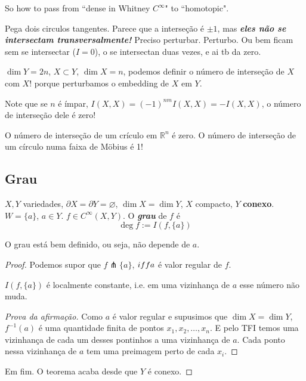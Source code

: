 \begin{remark}[dani]\leavevmode
So how to pass from ``dense in Whitney \(C^\infty\)" to ``homotopic".
\end{remark}

\begin{example}\leavevmode
	Pega dois circulos tangentes. Parece que a interseção é \(\pm  1\), mas \textit{\textbf{eles não se intersectam transversalmente!}} Preciso perturbar. Perturbo. Ou bem ficam sem se intersectar (\(I=0\)), o se intersectan duas vezes, e ai tb da zero.
\end{example}

\begin{remark}\leavevmode
\(\dim Y=2n\), \(X \subset Y\), \(\dim X= n\), podemos definir o número de interseção de \(X\) com \(X\)! porque perturbamos o embedding de \(X\) em \(Y\).

Note que se  \(n\) é ímpar, \(I(X,X)=(-1)^{nm}I(X,X)=-I(X,X)\), o número de interseção dele é zero!
\end{remark}

\begin{example}\leavevmode
	O número de interseção de um crículo em \(\mathbb{R}^n\) é zero. O número de interseção de um círculo numa faixa de Möbius é 1!
\end{example}

\subsection{Grau}

\begin{defn}\leavevmode
\(X,Y\) variedades, \(\partial X=\partial Y=\varnothing\), \(\dim X= \dim Y\), \(X\) compacto, \(Y\) \textbf{conexo}. \(W = \{ a\}\), \(a \in Y\). \( f \in C^\infty(X,Y)\). O  \textit{\textbf{grau}} de \(f \) é 
\[\operatorname{deg}f:=I(f, \{ a\})\]
\end{defn}

\begin{prop}\leavevmode
O grau está bem definido, ou seja, não depende de \(a\).
\end{prop}

\begin{proof}\leavevmode
Podemos supor que \(f \pitchfork  \{ a\}\), \(\\iff a\) é valor regular de \(f\).

\begin{claim}\leavevmode
\(I(f,\{a\})\) é localmente constante, i.e. em uma vizinhança de \(a\) esse número não muda.
\end{claim}

\begin{proof}[Prova da afirmação]\leavevmode
Como \(a\) é valor regular e supusimos que \(\dim X= \dim Y\), \(f^{-1}(a)\) é uma quantidade finita de pontos \(x_1,x_2,\ldots,x_n\). E pelo TFI temos uma vizinhança de cada um desses pontinhos a uma vizinhança de \(a\). Cada ponto nessa vizinhança de \(a\) tem uma preimagem perto de cada \(x_i\).
\end{proof}

Em fim. O teorema acaba desde que \(Y\) é conexo.
\end{proof}


